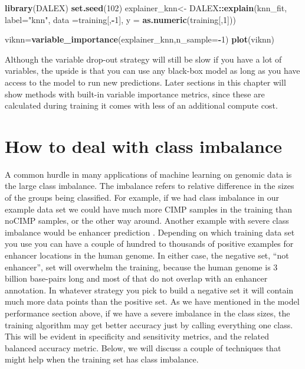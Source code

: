 \documentclass[12pt,]{krantz}
\newenvironment{Shaded}{\begin{snugshade}}{\end{snugshade}}
\newcommand{\DataTypeTok}[1]{\textcolor[rgb]{0.13,0.29,0.53}{#1}}
\newcommand{\DecValTok}[1]{\textcolor[rgb]{0.00,0.00,0.81}{#1}}
\newcommand{\KeywordTok}[1]{\textcolor[rgb]{0.13,0.29,0.53}{\textbf{#1}}}
\newcommand{\NormalTok}[1]{#1}
\newcommand{\OperatorTok}[1]{\textcolor[rgb]{0.81,0.36,0.00}{\textbf{#1}}}
\newcommand{\StringTok}[1]{\textcolor[rgb]{0.31,0.60,0.02}{#1}}
\begin{document}
\begin{Shaded}
\begin{Highlighting}[]
\KeywordTok{library}\NormalTok{(DALEX)}
\KeywordTok{set.seed}\NormalTok{(}\DecValTok{102}\NormalTok{)}
\NormalTok{explainer_knn<-}\StringTok{ }\NormalTok{DALEX}\OperatorTok{::}\KeywordTok{explain}\NormalTok{(knn_fit, }
                               \DataTypeTok{label=}\StringTok{"knn"}\NormalTok{, }
                               \DataTypeTok{data =}\NormalTok{training[,}\OperatorTok{-}\DecValTok{1}\NormalTok{], }
                               \DataTypeTok{y =} \KeywordTok{as.numeric}\NormalTok{(training[,}\DecValTok{1}\NormalTok{]))}

\NormalTok{viknn=}\KeywordTok{variable_importance}\NormalTok{(explainer_knn,}\DataTypeTok{n_sample=}\OperatorTok{-}\DecValTok{1}\NormalTok{)}
\KeywordTok{plot}\NormalTok{(viknn)}
\end{Highlighting}
\end{Shaded}

Although the variable drop-out strategy will still be slow if you have a lot of variables, the upside is that you can use any black-box model as long as you have access to the model to run new predictions. Later sections in this chapter will show methods with built-in variable importance metrics, since these are calculated during training it comes with less of an additional compute cost.

\hypertarget{how-to-deal-with-class-imbalance}{%
\section{How to deal with class imbalance}\label{how-to-deal-with-class-imbalance}}

A common hurdle in many applications of machine learning on genomic data is the large class imbalance. The imbalance refers to relative difference in the sizes of the groups being classified. For example, if we had class imbalance in our example data set we could have much more CIMP samples in the training than noCIMP samples, or the other way around. Another example with severe class imbalance would be enhancer prediction \citep{enhancerImbalance}. Depending on which training data set you use you can have a couple of hundred to thousands of positive examples for enhancer locations in the human genome. In either case, the negative set, ``not enhancer'', set will overwhelm the training, because the human genome is 3 billion base-pairs long and most of that do not overlap with an enhancer annotation. In whatever strategy you pick to build a negative set it will contain much more data points than the positive set. As we have mentioned in the model performance section above, if we have a severe imbalance in the class sizes, the training algorithm may get better accuracy just by calling everything one class. This will be evident in specificity and sensitivity metrics, and the related balanced accuracy metric. Below, we will discuss a couple of techniques that might help when the training set has class imbalance.
\end{document}
